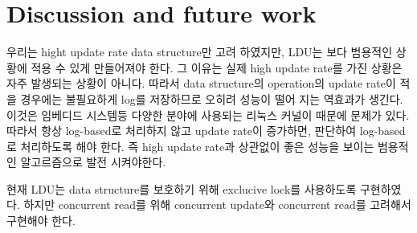 \section{Discussion and future work}

\ifkor
우리는 hight update rate data structure만 고려 하였지만, LDU는 보다 범용적인 상황에 적용 수 있게 만들어져야
한다.
그 이유는 실제 high update rate를 가진 상황은 자주 발생되는 상황이 아니다. 
따라서 data structure의 operation의 update rate이 적을 경우에는 불필요하게 log를 저장하므로 오히려 성능이 떨어
지는 역효과가 생긴다.
이것은 임베디드 시스템등 다양한 분야에 사용되는 리눅스 커널이 때문에 문제가 있다. 
따라서 항상 log-based로 처리하지 않고 update rate이 증가하면, 판단하여 log-based로 처리하도록 해야 한다.
즉 high update rate과 상관없이 좋은 성능을 보이는 범용적인 알고르즘으로 발전 시켜야한다.
\else

\fi


\ifkor
현재 LDU는 data structure를 보호하기 위해 exclucive lock를 사용하도록 구현하였다. 
하지만 concurrent read를 위해 concurrent update와 concurrent read를 고려해서 구현해야 한다.
\else
\fi












